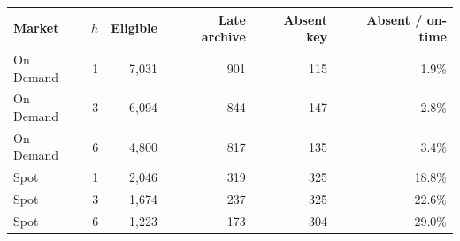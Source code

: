 \begin{tabular}{lrrrrr}
\toprule
Market & $h$ & Eligible & Late archive & Absent key & Absent / on-time \\
\midrule
On Demand & 1 & 7,031 & 901 & 115 & 1.9\% \\
On Demand & 3 & 6,094 & 844 & 147 & 2.8\% \\
On Demand & 6 & 4,800 & 817 & 135 & 3.4\% \\
Spot & 1 & 2,046 & 319 & 325 & 18.8\% \\
Spot & 3 & 1,674 & 237 & 325 & 22.6\% \\
Spot & 6 & 1,223 & 173 & 304 & 29.0\% \\
\bottomrule
\end{tabular}
